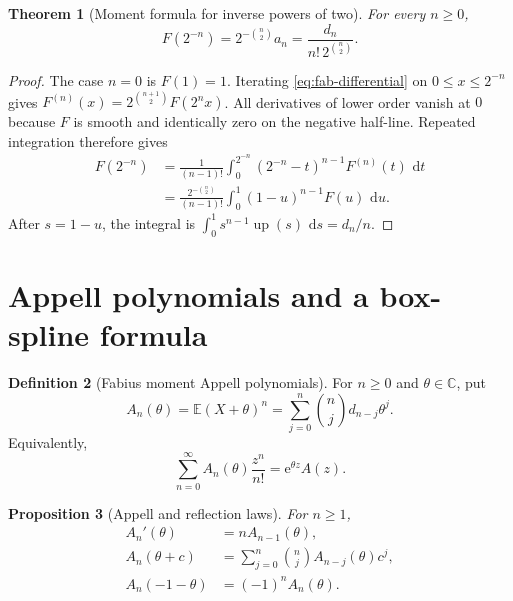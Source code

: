 \documentclass[11pt,oneside,openany]{book}
\newtheorem{theorem}{Theorem}[chapter]
\newtheorem{proposition}[theorem]{Proposition}
\theoremstyle{definition}
\newtheorem{definition}[theorem]{Definition}
\theoremstyle{remark}
\newcommand{\C}{\mathbb C}
\newcommand{\e}{\mathrm e}
\newcommand{\dd}{\,\mathrm d}
\newcommand{\E}{\mathbb E}
\begin{document}
\begin{theorem}[Moment formula for inverse powers of two]
\label{thm:fab-inverse-dyadic-moment}
For every $n\ge0$,
\begin{equation}
 F(2^{-n})=2^{-\binom n2}a_n
 =\frac{d_n}{n!\,2^{\binom n2}}.
 \label{eq:fab-inverse-dyadic-moment}
\end{equation}
\end{theorem}

\begin{proof}
The case $n=0$ is $F(1)=1$.  Iterating
\eqref{eq:fab-differential} on $0\le x\le2^{-n}$ gives
$F^{(n)}(x)=2^{\binom{n+1}{2}}F(2^nx)$.  All derivatives of lower order
vanish at $0$ because $F$ is smooth and identically zero on the negative
half-line.  Repeated integration therefore gives
\begin{align*}
 F(2^{-n})
 &=\frac1{(n-1)!}\int_0^{2^{-n}}
 (2^{-n}-t)^{n-1}F^{(n)}(t)\,\dd t\\
 &=\frac{2^{-\binom n2}}{(n-1)!}
 \int_0^1(1-u)^{n-1}F(u)\,\dd u.
\end{align*}
After $s=1-u$, the integral is
$\int_0^1s^{n-1}\operatorname{up}(s)\,\dd s=d_n/n$.
\end{proof}

\section{Appell polynomials and a box-spline formula}

\begin{definition}[Fabius moment Appell polynomials]
For $n\ge0$ and $\theta\in\C$, put
\begin{equation}
 A_n(\theta)=\E(X+\theta)^n
 =\sum_{j=0}^{n}\binom njd_{n-j}\theta^j.
 \label{eq:fab-Appell-def}
\end{equation}
Equivalently,
\begin{equation}
 \sum_{n=0}^{\infty}A_n(\theta)\frac{z^n}{n!}
 =\e^{\theta z}A(z).
 \label{eq:fab-Appell-egf}
\end{equation}
\end{definition}

\begin{proposition}[Appell and reflection laws]
For $n\ge1$,
\begin{align}
 A_n'(\theta)&=nA_{n-1}(\theta),
 \label{eq:fab-Appell-derivative}\\
 A_n(\theta+c)&=\sum_{j=0}^{n}\binom njA_{n-j}(\theta)c^j,
 \label{eq:fab-Appell-translation}\\
 A_n(-1-\theta)&=(-1)^nA_n(\theta).
 \label{eq:fab-Appell-reflection}
\end{align}
\end{proposition}
\end{document}
